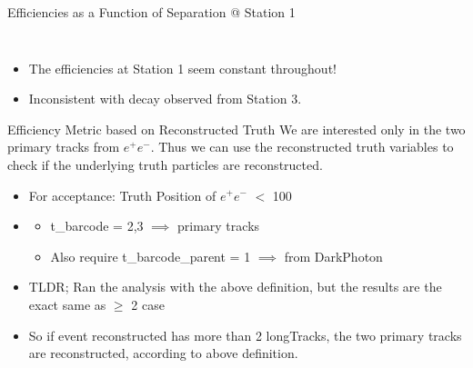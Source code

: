 \begin{frame}{Efficiencies as a Function of Separation @ Station 1}
\begin{columns}
\begin{column}{0.6\linewidth}
\begin{figure}
            \end{figure}
        \end{column}
    \end{columns}
    \begin{itemize}
        \item The efficiencies at Station 1 seem constant throughout!
        \item Inconsistent with decay observed from Station 3.
    \end{itemize}
\end{frame}




\begin{frame}{Efficiency Metric based on Reconstructed Truth}
    We are interested only in the two primary tracks from $e^+e^-$. Thus we can use the reconstructed truth variables to check if the underlying truth particles are reconstructed.
    \begin{itemize}
        \item For acceptance: Truth Position of $e^+e^-$ $<$ 100
        \item {}
        \begin{itemize}
            \item t\_barcode = 2,3 $\implies$ primary tracks 
            \item Also require t\_barcode\_parent = 1 $\implies$ from DarkPhoton

        \end{itemize}
        \item TLDR; Ran the analysis with the above definition, but the results are the exact same as $\geq$ 2 case 
        \item So if event reconstructed has more than 2 longTracks, the two primary tracks are reconstructed, according to above definition.
    \end{itemize}
\end{frame}



